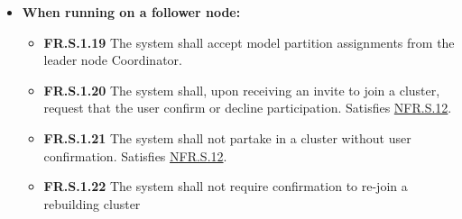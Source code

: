 \documentclass[12pt]{article}
\begin{document}
\begin{itemize}
\begin{itemize}
				nodes\footnote{A "failing" device is defined as severely degraded ($<50\%$ of historical)
				token throughput, whether it be due to network or device resource instability.}.
			\item \label{FR.S.1.11}\textbf{FR.S.1.11} The system shall rebuild the cluster on a node failing or leaving.
			\item \label{FR.S.1.12}\textbf{FR.S.1.12} The system shall rebuild the cluster on a node joining.
			\item \label{FR.S.1.13}\textbf{FR.S.1.13} The system shall retry in-progress requests after a cluster rebuild.
			\item \label{FR.S.1.14}\textbf{FR.S.1.14} The system shall accept multiple concurrent requests through the HTTP API.
				Related to \hyperref[NFR.S.5]{NFR.S.5}.
			\item \label{FR.S.1.15}\textbf{FR.S.1.15} The system shall communicate the cluster graph structure to each follower.
			\item \label{FR.S.1.16}\textbf{FR.S.1.16} The system shall provide the Web UI with cluster information, and
				accept cluster configuration instructions from the Web UI.
			\item \label{FR.S.1.17}\textbf{FR.S.1.17} The system shall not begin inference until all selected followers have
				confirmed participation. Satisfies \hyperref[NFR.S.12]{NFR.S.12}.
			\item \label{FR.S.1.18}\textbf{FR.S.1.18} The system shall only include selected followers in a new cluster.
				Satisfies \hyperref[NFR.S.12]{NFR.S.12}.
		\end{itemize}
	\item \textbf{When running on a follower node:}
		\begin{itemize}
			\item \label{FR.S.1.19}\textbf{FR.S.1.19} The system shall accept model partition assignments from the
				leader node Coordinator.
			\item \label{FR.S.1.20}\textbf{FR.S.1.20} The system shall, upon receiving an invite to join a cluster,
				request that the user confirm or decline participation. Satisfies \hyperref[NFR.S.12]{NFR.S.12}.
			\item \label{FR.S.1.21}\textbf{FR.S.1.21} The system shall not partake in a cluster without user confirmation.
				Satisfies \hyperref[NFR.S.12]{NFR.S.12}.
			\item \label{FR.S.1.22}\textbf{FR.S.1.22} The system shall not require confirmation to re-join a rebuilding cluster

\end{itemize}
\end{itemize}
\end{document}
